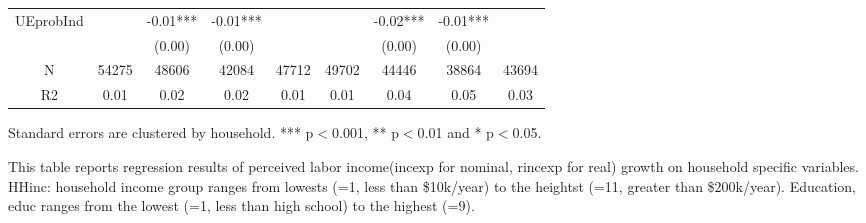 \begin{table}[ht]
\begin{adjustbox}{width={0.9\textwidth},totalheight={\textheight}}
\begin{threeparttable}
\begin{tabular}{ccccccccc}
UEprobInd    &           &  -0.01*** &   -0.01*** &             &           &   -0.02*** &    -0.01*** &              \\
             &           &    (0.00) &     (0.00) &             &           &     (0.00) &      (0.00) &              \\
N            &     54275 &     48606 &      42084 &       47712 &     49702 &      44446 &       38864 &        43694 \\
R2           &      0.01 &      0.02 &       0.02 &        0.01 &      0.01 &       0.04 &        0.05 &         0.03 \\
\bottomrule
\end{tabular}
\begin{tablenotes}\item Standard errors are clustered by household. *** p$<$0.001, ** p$<$0.01 and * p$<$0.05. 
\item This table reports regression results of perceived labor income(incexp for nominal, rincexp for real) growth on household specific variables. HHinc: household income group ranges from lowests (=1, less than \$10k/year) to the heightst (=11, greater than \$200k/year). Education, educ ranges from the lowest (=1, less than high school) to the highest (=9).
\end{tablenotes}
\end{threeparttable}
\end{adjustbox}
\end{table}